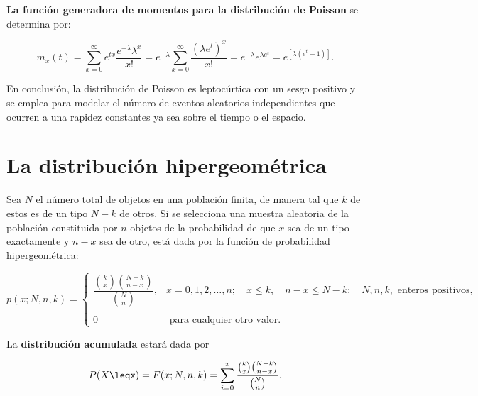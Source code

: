\textbf{La función generadora de momentos para la distribución de Poisson} se determina por:

\begin{tcolorbox}
    $$m_x(t)=\sum_{x=0}^\infty e^{tx}\dfrac{e^{-\lambda}\lambda^x}{x!}=e^{-\lambda}\sum_{x=0}^\infty \dfrac{\left(\lambda e^t\right)^x}{x!}=e^{-\lambda}e^{\lambda e^t}=e^{[\lambda(e^t-1)]}.$$
\end{tcolorbox}

\begin{tcolorbox}
    En conclusión, la distribución de Poisson es leptocúrtica con un sesgo positivo y se emplea para modelar el número de eventos aleatorios independientes que ocurren a una rapidez constantes ya sea sobre el tiempo o el espacio.
\end{tcolorbox}


\section{La distribución hipergeométrica}

\begin{def.}
    Sea $N$ el número total de objetos en una población finita, de manera tal que $k$ de estos es de un tipo $N-k$ de otros. Si se selecciona una muestra aleatoria de la población constituida por $n$ objetos de la probabilidad de que $x$ sea de un tipo exactamente y $n-x$ sea de otro, está dada por la función de probabilidad hipergeométrica:
    \begin{tcolorbox}
	$$p(x;N,n,k)=\left\{\begin{array}{ll}
		\dfrac{{k \choose x}{N-k\choose n-x}}{{N\choose n}}, & x=0,1,2,\ldots,n;\quad x\leq k, \quad n-x\leq N-k;\quad N,n,k, \mbox{ enteros positivos,}\\\\
		0 & \mbox{ para cualquier otro valor.}
	\end{array}\right.$$
    \end{tcolorbox}
\end{def.}

La \textbf{distribución acumulada} estará dada por 

\begin{tcolorbox}
    $$P(X\leqx) = F(x;N,n,k)=\sum_{i=0}^x \dfrac{{k \choose x}{N-k\choose n-x}}{{N\choose n}}.$$
\end{tcolorbox}


